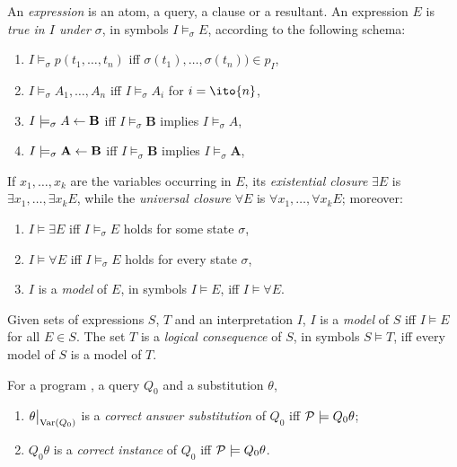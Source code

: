 \begin{dfn}
    An \emph{expression} is an atom, a query, a clause or a resultant.
    An expression \(E\) is \emph{true in \(I\) under \(\sigma\)}, in symbols \(I \models_{\sigma} E\), according to the following schema:
    \begin{enumerate}
        \item \(I \models_{\sigma} p(t_1,\dotsc,t_n)\) iff \(\sigma(t_1),\dotsc,\sigma(t_n)) \in p_I\),
        \item \(I \models_\sigma A_1,\dotsc,A_n\) iff \(I \models_\sigma A_i\) for \(i = \ito{n}\),
        \item \(I \models_\sigma A \leftarrow \mathbf{B}\) iff \(I \models_\sigma \mathbf{B}\) implies \(I \models_\sigma A\),
        \item \(I \models_\sigma \mathbf{A} \leftarrow \mathbf{B}\) iff \(I \models_\sigma \mathbf{B}\) implies \(I \models_\sigma \mathbf{A}\),
    \end{enumerate}
    If \(x_1,\dotsc,x_k\) are the variables occurring in \(E\), its \emph{existential closure} \(\exists{E}\) is \(\exists{x_1},\dotsc,\exists{x_k}E\), while the \emph{universal closure} \(\forall{E}\) is \(\forall{x_1},\dotsc,\forall{x_k}E\); moreover:
    \begin{enumerate}
        \item \(I \models \exists{E}\) iff \(I \models_\sigma E\) holds for some state \(\sigma\),
        \item \(I \models \forall{E}\) iff \(I \models_\sigma E\) holds for every state \(\sigma\),
        \item \(I\) is a \emph{model} of \(E\), in symbols \(I \models E\), iff \(I \models \forall{E}\).
    \end{enumerate}
\end{dfn}

\begin{dfn}[Consequence]
    Given sets of expressions \(S\), \(T\) and an interpretation \(I\), \(I\) is a \emph{model} of \(S\) iff \(I \models E\) for all \(E \in S\).
    The set \(T\) is a \emph{logical consequence} of \(S\), in symbols \(S \models T\), iff every model of \(S\) is a model of \(T\).
\end{dfn}

\begin{dfn}
    For a program \prog, a query \(Q_0\) and a substitution \(\theta\),
    \begin{enumerate}
        \item \(\restr{\theta}{\Var(Q_0)}\) is a \emph{correct answer substitution} of \(Q_0\) iff \(\mathcal{P} \models Q_0\theta\);
        \item \(Q_0\theta\) is a \emph{correct instance} of \(Q_0\) iff \(\mathcal{P} \models Q_0\theta\).
    \end{enumerate}
\end{dfn}


